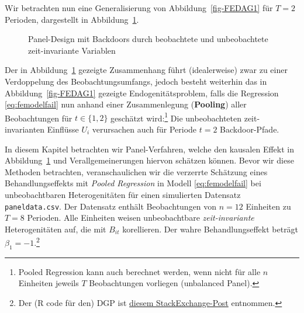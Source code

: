 \documentclass[
  a4paper,
  DIV=11,
  oneside]{scrreprt}
\begin{document}
Wir betrachten nun eine Generalisierung von Abbildung~\ref{fig-FEDAG1}
für \(T=2\) Perioden, dargestellt in Abbildung~\ref{fig-FEDAG2}.

\begin{figure}[t]


\caption{\label{fig-FEDAG2}Panel-Design mit Backdoors durch beobachtete
und unbeobachtete zeit-invariante Variablen}

\end{figure}%

Der in Abbildung~\ref{fig-FEDAG2} gezeigte Zusammenhang führt
(idealerweise) zwar zu einer Verdoppelung des Beobachtungsumfangs,
jedoch besteht weiterhin das in Abbildung~\ref{fig-FEDAG1} gezeigte
Endogenitätsproblem, falls die Regression \eqref{eq:femodelfail} nun
anhand einer Zusammenlegung (\textbf{Pooling}) aller Beobachtungen für
\(t\in\{1,2\}\) geschätzt wird:\footnote{Pooled Regression kann auch
  berechnet werden, wenn nicht für alle \(n\) Einheiten jeweils \(T\)
  Beobachtungen vorliegen (unbalanced Panel).} Die unbeobachteten
zeit-invarianten Einflüsse \(U_i\) verursachen auch für Periode \(t=2\)
Backdoor-Pfade.

In diesem Kapitel betrachten wir Panel-Verfahren, welche den kausalen
Effekt in Abbildung~\ref{fig-FEDAG2} und Verallgemeinerungen hiervon
schätzen können. Bevor wir diese Methoden betrachten, veranschaulichen
wir die verzerrte Schätzung eines Behandlungseffekts mit \emph{Pooled
Regression} in Modell \eqref{eq:femodelfail} bei unbeobachtbaren
Heterogenitäten für einen simulierten Datensatz \texttt{paneldata.csv}.
Der Datensatz enthält Beobachtungen von \(n=12\) Einheiten zu \(T=8\)
Perioden. Alle Einheiten weisen unbeobachtbare \emph{zeit-invariante}
Heterogenitäten auf, die mit \(B_{it}\) korellieren. Der wahre
Behandlungseffekt beträgt \(\beta_1 = -1\).\footnote{Der (R code für
  den) DGP ist \href{https://stats.stackexchange.com/a/188559}{diesem
  StackExchange-Post} entnommen.}
\end{document}
